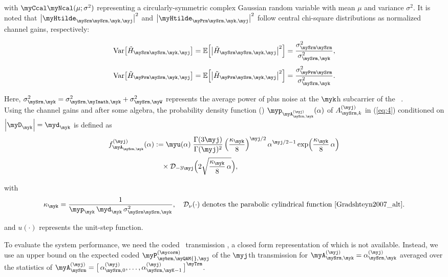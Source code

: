 with $\myCcal\myNcal(\mu;\sigma^{2})$ representing a circularly-symmetric complex Gaussian random variable with mean $\mu$ and variance $\sigma^{2}$. 
It is noted that $\bigl|\myHtilde_{\mySrm\mySrm,\myk,\myj}\bigr|^{2}$ and $\bigl|\myHtilde_{\myPrm\mySrm,\myk,\myj}\bigr|^{2}$ follow central chi-square distributions as normalized channel gains, respectively:

\begin{align}
\mathrm{Var}\bigl[\tilde{H}_{\mySrm\mySrm,\myk,\myj}\bigr] 
&= \mathbb{E}\Bigl[ \bigl|\tilde{H}_{\mySrm\mySrm,\myk,\myj}\bigr|^2 \Bigr] 
= \frac{\sigma^2_{\mySrm\mySrm}}{\sigma^2_{\mySrm,\myk}}, \\[0.3em]
\mathrm{Var}\bigl[\tilde{H}_{\myPrm\mySrm,\myk,\myj}\bigr] 
&= \mathbb{E}\Bigl[ \bigl|\tilde{H}_{\myPrm\mySrm,\myk,\myj}\bigr|^2 \Bigr] 
= \frac{\sigma^2_{\myPrm\mySrm}}{\sigma^2_{\mySrm,\myk}}.
\end{align}


Here, $\sigma^{2}_{\mySrm,\myk} = \sigma^{2}_{\mySrm,\myImath,\myk} + \sigma^{2}_{\mySrm,\myW}$ represents the average power of \myTPI{} plus noise at the $\myk$h subcarrier of the \mySU\ \myRX{}.\\ Using the channel gains and after some algebra, the probability density function (\myPDF{}) $\myp_{\myA^{(\myj)}_{\mySrm,\myk}} (\alpha)$ of $A^{(\myj)}_{\mySrm,k}$ in (\ref{eq:4}) conditioned on $\left|\myD_\myk\right| = \myd_\myk$ is defined as
\begin{align}
f^{(\myj)}_{\myA_{\mySrm,\myk}}(\alpha) 
&:= \myu(\alpha) \; 
   \frac{\Gamma(3\myj)}{\Gamma(\myj)^2} 
   \left( \frac{\kappa_\myk}{8} \right)^{\myj/2} 
   \alpha^{\myj/2 - 1} 
   \exp\Bigl(\frac{\kappa_\myk}{8} \, \alpha \Bigr) 
   \nonumber \\[0.2em]
&\quad \times \mathcal{D}_{-3\myj}\Bigl( 2 \sqrt{\frac{\kappa_\myk}{8} \, \alpha} \Bigr),
\label{eq:3}
\end{align}

\noindent with 
\[
\kappa_\myk = \frac{1}{\myp_\myk \, \myd_\myk \, \sigma^2_{\mySrm\mySrm,\myk}}, \quad
\mathcal{D}_\nu(\cdot) \text{ denotes the parabolic cylindrical function~\cite{Gradshteyn2007_alt}}.
\]

and $u(\cdot)$ represents the unit-step function.

To evaluate the system performance, we need the coded \mySU\ transmission \myBEP{}, a closed form representation of which is not available. Instead, we use an upper bound on the expected coded \myBEP{} $\myP^{(\mycorm)}_{\mybrm,\mathrm{\myQAM{}},\myj}$ of the $\myj$th transmission for 
$\myA^{(\myj)}_{\mySrm,\myk} = \alpha^{(\myj)}_{\mySrm,\myk}$ averaged over the statistics of 
$\mathbf{\myA}^{(\myj)}_{\mySrm} = \big[\, \alpha^{(\myj)}_{\mySrm,0},\ldots,\alpha^{(\myj)}_{\mySrm,\myK-1} \,\big]^{\myTrm}$.


